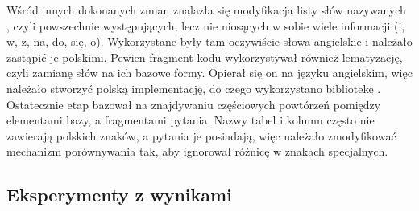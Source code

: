 Wśród innych dokonanych zmian znalazła się modyfikacja listy słów nazywanych , czyli powszechnie występujących, lecz nie niosących w sobie wiele informacji (i, w, z, na, do, się, o). Wykorzystane były tam oczywiście słowa angielskie i należało zastąpić je polskimi. Pewien fragment kodu wykorzystywał również lematyzację, czyli zamianę słów na ich bazowe formy. Opierał się on na języku angielskim, więc należało stworzyć polską implementację, do czego wykorzystano bibliotekę . Ostatecznie etap  bazował na znajdywaniu częściowych powtórzeń pomiędzy elementami bazy, a fragmentami pytania. Nazwy tabel i kolumn często nie zawierają polskich znaków, a pytania je posiadają, więc należało zmodyfikować mechanizm porównywania tak, aby ignorował różnicę w znakach specjalnych.

\subsection{Eksperymenty z wynikami}
